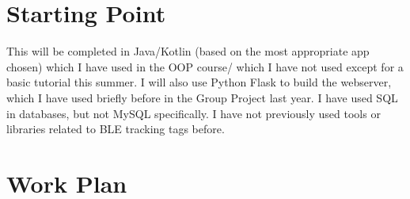 \documentclass{article}
\begin{document}
\section{Starting Point}

This will be completed in Java/Kotlin (based on the most appropriate app chosen) which I have used in the OOP course/ which I have not used except for a basic tutorial this summer.
I will also use Python Flask to build the webserver, which I have used briefly before in the Group Project last year. I have used SQL in databases, but not MySQL specifically. I have not previously used tools or libraries related to BLE tracking tags before.

\pagebreak
\section{Work Plan}
\end{document}
